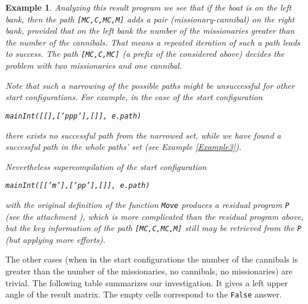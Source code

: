 \documentclass[preprint]{sigplanconf}
\newtheorem{example}{Example}
\begin{document}
\begin{example}
Analyzing this result program we see that if the boat is on the left bank, then the path \texttt{[MC,C,MC,M]}  adds a pair (missionary-cannibal) on the right bank, provided that on the left bank the number of the missionaries greater than the number of the cannibals. That means a repeated iteration of such a path leads to success. The path \texttt{[MC,C,MC]} (a prefix of the considered above) decides the problem with two missionaries and one cannibal.

Note that such a narrowing of the possible paths might be unsuccessful for other start configurations. For example, in the case of the start configuration
\begin{center}
\texttt{mainInt([[],['ppp'],[]], e.path)}
\end{center}
 there exists no 
 successful path from the narrowed set, while we have found a successful path in the whole paths' set (see Example \ref{Example3}). 
 
 Nevertheless supercompilation of the start configuration 
\begin{center}
\texttt{mainInt([['m'],['pp'],[]], e.path)} 
\end{center}
with the original definition of the function \texttt{Move} produces a residual program \texttt{P} (see the attachment \cite{Lis_Nem:MissionariesAttachment}), which is more complicated 
than 
the residual program above, but the key information of the path \texttt{[MC,C,MC,M]} still may be retrieved from the \texttt{P} (but applying more efforts).

\end{example}

The other cases (when in the start configurations the number of the cannibals is greater than the number of the missionaries, no cannibals, no missionaries) are trivial.
 The following table summarizes our investigation.  It gives a left upper angle of the result matrix. The empty cells correspond to the \texttt{False} answer.
\end{document}
